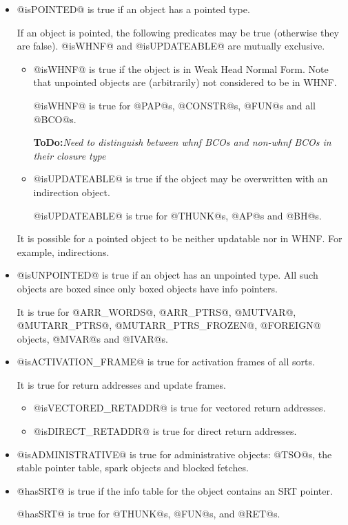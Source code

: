 \documentclass[11pt]{article}
\newcommand{\ToDo}[1]{{{\bf ToDo:}\sl #1}}
\begin{document}
\begin{itemize}

\item @isPOINTED@ is true if an object has a pointed type.

If an object is pointed, the following predicates may be true
(otherwise they are false).  @isWHNF@ and @isUPDATEABLE@ are
mutually exclusive.

\begin{itemize} 
\item @isWHNF@ is true if the object is in Weak Head Normal Form.  
Note that unpointed objects are (arbitrarily) not considered to be in WHNF.

@isWHNF@ is true for @PAP@s, @CONSTR@s, @FUN@s and all @BCO@s.

\ToDo{Need to distinguish between whnf BCOs and non-whnf BCOs in their
closure type}

\item @isUPDATEABLE@ is true if the object may be overwritten with an
 indirection object.

@isUPDATEABLE@ is true for @THUNK@s, @AP@s and @BH@s.

\end{itemize}

It is possible for a pointed object to be neither updatable nor in
WHNF.  For example, indirections.

\item @isUNPOINTED@ is true if an object has an unpointed type.
All such objects are boxed since only boxed objects have info pointers.

It is true for @ARR_WORDS@, @ARR_PTRS@, @MUTVAR@, @MUTARR_PTRS@,
@MUTARR_PTRS_FROZEN@, @FOREIGN@ objects, @MVAR@s and @IVAR@s.

\item @isACTIVATION_FRAME@ is true for activation frames of all sorts.

It is true for return addresses and update frames.
\begin{itemize}
\item @isVECTORED_RETADDR@ is true for vectored return addresses.
\item @isDIRECT_RETADDR@ is true for direct return addresses.
\end{itemize}

\item @isADMINISTRATIVE@ is true for administrative objects:
@TSO@s, the stable pointer table, spark objects and blocked fetches.

\item @hasSRT@ is true if the info table for the object contains an
SRT pointer.  

@hasSRT@ is true for @THUNK@s, @FUN@s, and @RET@s.

\end{itemize}
\end{document}
